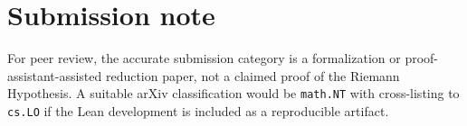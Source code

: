 \documentclass[11pt]{amsart}
\begin{document}
\section{Submission note}

For peer review, the accurate submission category is a formalization or
proof-assistant-assisted reduction paper, not a claimed proof of the Riemann
Hypothesis.  A suitable arXiv classification would be \texttt{math.NT} with
cross-listing to \texttt{cs.LO} if the Lean development is included as a
reproducible artifact.
\end{document}
